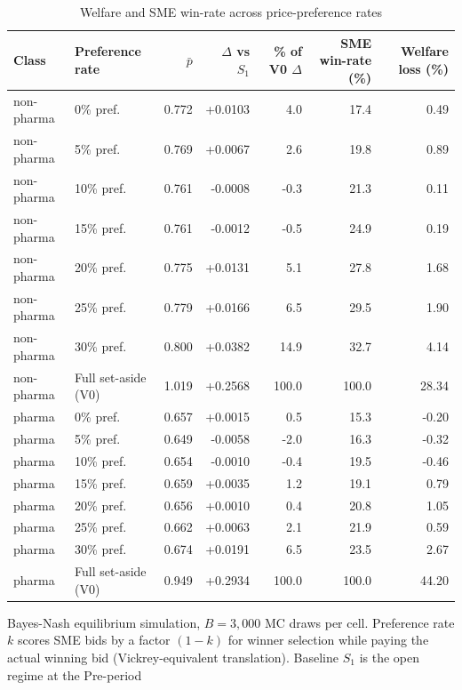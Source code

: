\begin{table}[!htbp]
\centering
\small
\caption{Welfare and SME win-rate across price-preference rates}
\label{tab:v3_preference_grid}
\begin{threeparttable}
\setlength{\tabcolsep}{4pt}
\scriptsize
\begin{tabular}{llrrrrr}
\toprule
Class & Preference rate & $\bar p$ & $\Delta$ vs $S_1$ & \% of V0 $\Delta$ & SME win-rate (\%) & Welfare loss (\%) \\
\midrule
non-pharma & 0\% pref. & 0.772 & +0.0103 & 4.0 & 17.4 & 0.49 \\
non-pharma & 5\% pref. & 0.769 & +0.0067 & 2.6 & 19.8 & 0.89 \\
non-pharma & 10\% pref. & 0.761 & -0.0008 & -0.3 & 21.3 & 0.11 \\
non-pharma & 15\% pref. & 0.761 & -0.0012 & -0.5 & 24.9 & 0.19 \\
non-pharma & 20\% pref. & 0.775 & +0.0131 & 5.1 & 27.8 & 1.68 \\
non-pharma & 25\% pref. & 0.779 & +0.0166 & 6.5 & 29.5 & 1.90 \\
non-pharma & 30\% pref. & 0.800 & +0.0382 & 14.9 & 32.7 & 4.14 \\
non-pharma & Full set-aside (V0) & 1.019 & +0.2568 & 100.0 & 100.0 & 28.34 \\
pharma & 0\% pref. & 0.657 & +0.0015 & 0.5 & 15.3 & -0.20 \\
pharma & 5\% pref. & 0.649 & -0.0058 & -2.0 & 16.3 & -0.32 \\
pharma & 10\% pref. & 0.654 & -0.0010 & -0.4 & 19.5 & -0.46 \\
pharma & 15\% pref. & 0.659 & +0.0035 & 1.2 & 19.1 & 0.79 \\
pharma & 20\% pref. & 0.656 & +0.0010 & 0.4 & 20.8 & 1.05 \\
pharma & 25\% pref. & 0.662 & +0.0063 & 2.1 & 21.9 & 0.59 \\
pharma & 30\% pref. & 0.674 & +0.0191 & 6.5 & 23.5 & 2.67 \\
pharma & Full set-aside (V0) & 0.949 & +0.2934 & 100.0 & 100.0 & 44.20 \\
\bottomrule
\end{tabular}
\begin{tablenotes}\footnotesize
\item Bayes-Nash equilibrium simulation, $B = 3{,}000$ MC draws per cell.
Preference rate $k$ scores SME bids by a factor $(1-k)$ for winner
selection while paying the actual winning bid (Vickrey-equivalent
translation). Baseline $S_1$ is the open regime at the Pre-period

\end{tablenotes}
\end{threeparttable}
\end{table}
